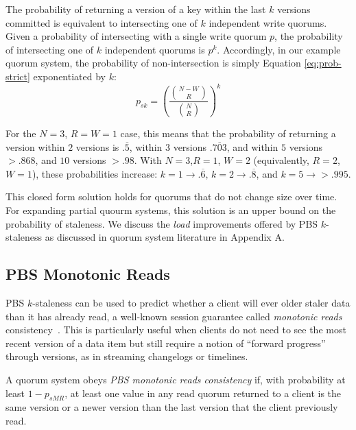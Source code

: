 \documentclass{vldb}
\newcommand{\subsectionskip}{-0em}
\begin{document}
The probability of returning a version of a key within the last $k$
versions committed is equivalent to intersecting one of $k$
independent write quorums.  Given a probability of intersecting with a
single write quorum $p$, the probability of intersecting one of $k$
independent quorums is $p^k$.  Accordingly, in our example quorum
system, the probability of non-intersection is simply Equation
\ref{eq:prob-strict} exponentiated by $k$:
\begin{equation}
\label{eq:k-consistency}
p_{sk} = \left(\frac{{N-W \choose R}}{{N \choose R}}\right)^k
\end{equation}

For the $N$$=$$3$, $R$$=$$W$$=$$1$ case, this means that the
probability of returning a version within $2$ versions is
$.\overline{5}$, within $3$ versions $.\overline{703}$, and within $5$
versions $> .868$, and $10$ versions $>.98$.  With
$N$$=$$3$,$R$$=$$1$, $W$$=$$2$ (equivalently, $R$$=$$2$, $W$$=$$1$),
these probabilities increase: $k$$=$$1 \rightarrow .\overline{6}$, $k$$=$$2
\rightarrow .\overline{8}$, and $k$$=$$5 \rightarrow > .995$.

This closed form solution holds for quorums that do not change size
over time.  For expanding partial quourm systems, this solution is an
upper bound on the probability of staleness.  We discuss the
\textit{load} improvements offered by PBS $k$-staleness as discussed
in quorum system literature in Appendix A.

\vspace{\subsectionskip}\subsection{PBS Monotonic Reads}

PBS $k$-staleness can be used to predict whether a client will ever
older staler data than it has already read, a well-known session
guarantee called \textit{monotonic reads}
consistency~\cite{sessionguarantees}.  This is particularly useful
when clients do not need to see the most recent version of a data item
but still require a notion of ``forward progress'' through versions,
as in streaming changelogs or timelines.

\begin{definition}
\label{def:prob-mr}
A quorum system obeys \textit{PBS monotonic reads consistency} if,
with probability at least $1-p_{sMR}$, at least one value in any
read quorum returned to a client is the same version or a newer
version than the last version that the client previously read.
\end{definition}
\end{document}
